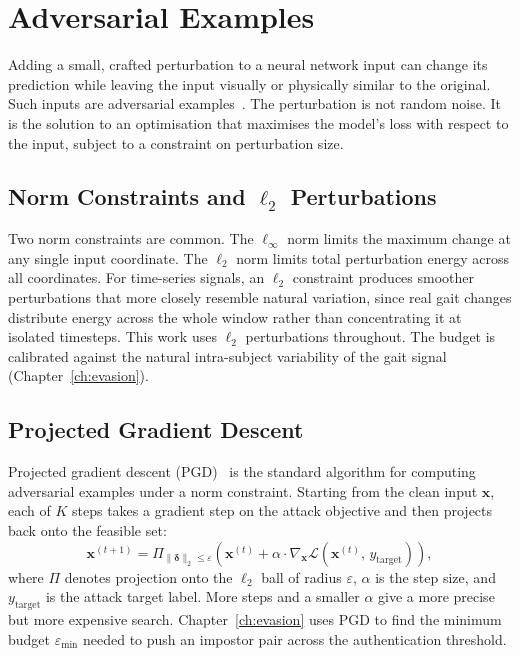 \section{Adversarial Examples}
\label{sec:bg_adv}

Adding a small, crafted perturbation to a neural network input can change its prediction while leaving the input visually or physically similar to the original. Such inputs are adversarial examples~\cite{goodfellow2015explaining}. The perturbation is not random noise. It is the solution to an optimisation that maximises the model's loss with respect to the input, subject to a constraint on perturbation size.

\subsection{Norm Constraints and $\ell_2$ Perturbations}
\label{ssec:bg_adv_norm}

Two norm constraints are common. The $\ell_\infty$ norm limits the maximum change at any single input coordinate. The $\ell_2$ norm limits total perturbation energy across all coordinates. For time-series signals, an $\ell_2$ constraint produces smoother perturbations that more closely resemble natural variation, since real gait changes distribute energy across the whole window rather than concentrating it at isolated timesteps. This work uses $\ell_2$ perturbations throughout. The budget is calibrated against the natural intra-subject variability of the gait signal (Chapter~\ref{ch:evasion}).

\subsection{Projected Gradient Descent}
\label{ssec:bg_pgd}

Projected gradient descent (PGD)~\cite{madry2018towards} is the standard algorithm for computing adversarial examples under a norm constraint. Starting from the clean input $\mathbf{x}$, each of $K$ steps takes a gradient step on the attack objective and then projects back onto the feasible set:
\begin{equation}
  \mathbf{x}^{(t+1)} = \Pi_{\|\boldsymbol{\delta}\|_2 \leq \varepsilon}
  \!\left(\mathbf{x}^{(t)} + \alpha \cdot \nabla_{\mathbf{x}}
  \mathcal{L}(\mathbf{x}^{(t)},\, y_{\text{target}})\right),
  \label{eq:pgd}
\end{equation}
where $\Pi$ denotes projection onto the $\ell_2$ ball of radius $\varepsilon$, $\alpha$ is the step size, and $y_{\text{target}}$ is the attack target label. More steps and a smaller $\alpha$ give a more precise but more expensive search. Chapter~\ref{ch:evasion} uses PGD to find the minimum budget $\varepsilon_\text{min}$ needed to push an impostor pair across the authentication threshold.

